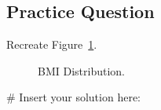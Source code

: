\documentclass[
  letterpaper,
]{latex/krantz}
\makeatletter
\newenvironment{Shaded}{\begin{snugshade}}{\end{snugshade}}
\newcommand{\CommentTok}[1]{\textcolor[rgb]{0.37,0.37,0.37}{#1}}
\newenvironment{kframe}{%
\medskip{}
\setlength{\fboxsep}{.8em}
 \def\at@end@of@kframe{}%
 \ifinner\ifhmode%
  \def\at@end@of@kframe{\end{minipage}}%
  \begin{minipage}{\columnwidth}%
 \fi\fi%
 \def\FrameCommand##1{\hskip\@totalleftmargin \hskip-\fboxsep
 \colorbox{shadecolor}{##1}\hskip-\fboxsep
     \hskip-\linewidth \hskip-\@totalleftmargin \hskip\columnwidth}%
 \MakeFramed {\advance\hsize-\width
   \@totalleftmargin\z@ \linewidth\hsize
   \@setminipage}}%
 {\par\unskip\endMakeFramed%
 \at@end@of@kframe}
\renewenvironment{Shaded}{\begin{kframe}}{\end{kframe}}
\makeatother
\begin{document}
\subsection{Practice Question}\label{practice-question-14}

Recreate Figure~\ref{fig-bmi-distribution}.

\begin{figure}


\caption{\label{fig-bmi-distribution}BMI Distribution.}

\end{figure}%

\begin{Shaded}
\begin{Highlighting}[]
\CommentTok{\# Insert your solution here:}
\end{Highlighting}
\end{Shaded}
\end{document}

